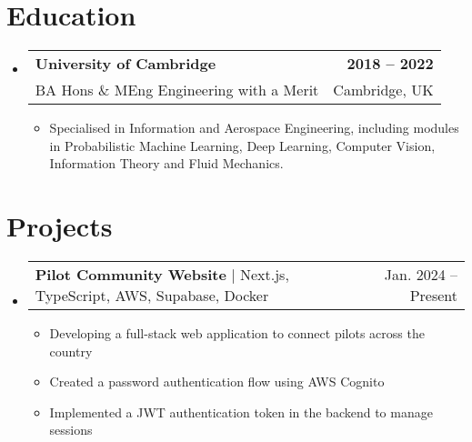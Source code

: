 \documentclass[letterpaper,10pt]{article}
\makeatletter
\newcommand{\resumeItem}[1]{
  \item\small{
    {#1 \vspace{-2pt}}
  }
}
\newcommand{\educationItem}[4]{
  \vspace{-2pt}
  \item
  \begin{tabular*}{0.97\textwidth}[t]{l@{\extracolsep{\fill}}r}
    \textbf{#1} & \textbf{#2} \\
    \small#3 & \small#4
  \end{tabular*}\vspace{-7pt}
}
\newcommand{\resumeProjectHeading}[2]{
    \item
    \begin{tabular*}{0.97\textwidth}{l@{\extracolsep{\fill}}r}
      \small#1 & #2 \\
    \end{tabular*}\vspace{-7pt}
}
\newcommand{\resumeSubHeadingListStart}{\begin{itemize}[leftmargin=0.15in, label={}]}
\newcommand{\resumeSubHeadingListEnd}{\end{itemize}}
\newcommand{\resumeItemListStart}{\begin{itemize}}
\newcommand{\resumeItemListEnd}{\end{itemize}\vspace{-5pt}}
\makeatother
\begin{document}
\section{Education}
  \resumeSubHeadingListStart
    \educationItem
      {University of Cambridge}
      {2018 -- 2022}
      {BA Hons \& MEng Engineering with a Merit}
      {Cambridge, UK}
    \resumeItemListStart
      \resumeItem{Specialised in Information and Aerospace Engineering, including modules in Probabilistic Machine Learning, Deep Learning, Computer Vision, Information Theory and Fluid Mechanics.}
    \resumeItemListEnd
  \resumeSubHeadingListEnd

  \section{Projects}
  \resumeSubHeadingListStart
    \resumeProjectHeading
        {\textbf{Pilot Community Website} $|$ Next.js, TypeScript, AWS, Supabase, Docker}{Jan. 2024 -- Present}
        \resumeItemListStart
          \resumeItem{Developing a full-stack web application to connect pilots across the country}
          \resumeItem{Created a password authentication flow using AWS Cognito}
          \resumeItem{Implemented a JWT authentication token in the backend to manage sessions}
        \resumeItemListEnd
  \resumeSubHeadingListEnd

\end{document}
